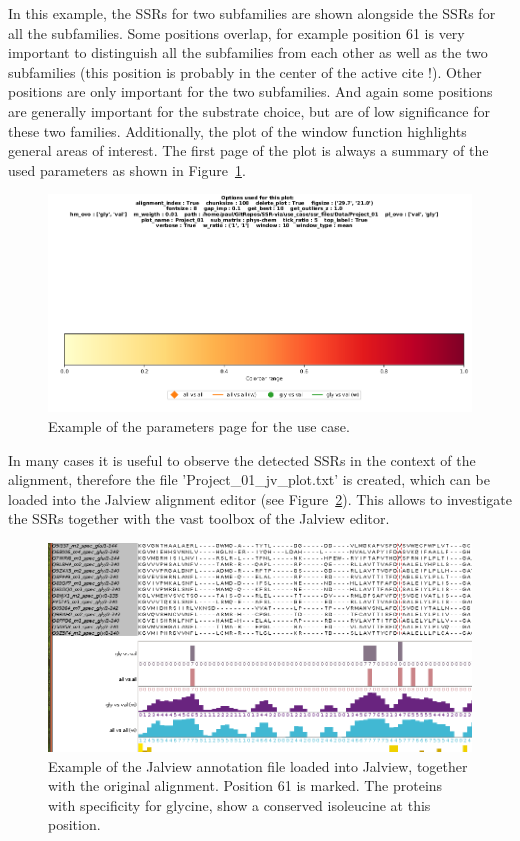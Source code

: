\documentclass[a4paper,10pt]{article}
\begin{document}
In this example,
the SSRs for two subfamilies are shown alongside the SSRs for all the subfamilies. Some positions overlap, for example position 61 is 
very important to distinguish all the subfamilies from each other as well as the two subfamilies (this position is probably in the center of the active cite !).
Other positions are only important for the two subfamilies. And again some positions are generally important for the substrate choice, but are of low significance for these
two families.
Additionally, the plot of the window function highlights general areas of interest. 
The first page of the plot is always a summary of the used parameters as shown in Figure~\ref{fig:plot_page1}.

\begin{figure}
  \includegraphics[width=\linewidth]{./figs/plot_page1}
  \caption{Example of the parameters page for the use case.}
  \label{fig:plot_page1}
\end{figure}

In many cases it is useful to observe the detected SSRs in the context of the alignment, therefore the file 'Project\_01\_jv\_plot.txt' is created,
which can be loaded into the Jalview alignment editor (see Figure~\ref{fig:JV_ali}). This allows to investigate the 
SSRs together with the vast toolbox of the Jalview editor.

\begin{figure}
  \includegraphics[width=\linewidth]{./figs/JV_ali}
  \caption{Example of the Jalview annotation file loaded into Jalview, together with the original alignment. Position 61 is marked. The proteins
  with specificity for glycine, show a conserved isoleucine at this position.}
  \label{fig:JV_ali}
\end{figure}
\end{document}
